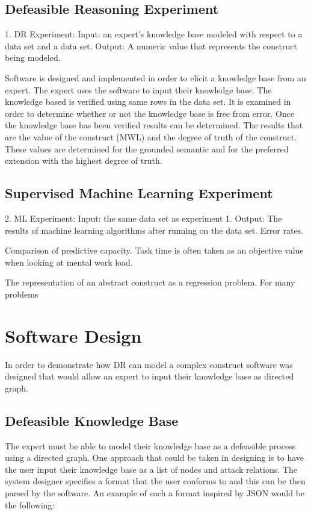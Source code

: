 \subsection{Defeasible Reasoning Experiment}


1. DR Experiment: Input: an expert's knowledge base modeled with respect to a data set and a data set. Output: A numeric value that represents the construct being modeled.


Software is designed and implemented in order to elicit a knowledge base from an expert.
The expert uses the software to input their knowledge base.
The knowledge based is verified using same rows in the data set. It is examined in order to determine whether or not the knowledge base is free from error.
Once the knowledge base has been verified results can be determined. The results that are the value of the construct (MWL) and the degree of truth of the construct. These values are determined for the grounded semantic and for the preferred extension with the highest degree of truth. 

\subsection{Supervised Machine Learning Experiment}


2. ML Experiment: Input: the same data set as experiment 1.
Output: The results of machine learning algorithms after running on the data set. Error rates.

Comparison of predictive capacity.
Task time is often taken as an objective value when looking at mental work load.

The representation of an abstract construct as a regression problem. For many problems 






\section{Software Design}

In order to demonstrate how DR can model a complex construct software was designed that would allow an expert to input their knowledge base as directed graph.
\subsection{Defeasible Knowledge Base}
The expert must be able to model their knowledge base as a defeasible process using a directed graph. One approach that could be taken in designing is to have the user input their knowledge base as a list of nodes and attack relations. The system designer specifies a format that the user conforms to and this can be then parsed by the software. An example of such a format inspired by JSON would be the following:

